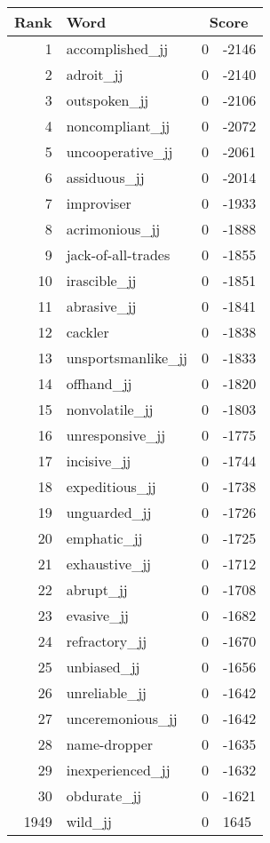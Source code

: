 \begin{longtable}[!htbp]{| rlr@{.}l |}
    \hline
    \textbf{Rank} & \textbf{Word} & \multicolumn{2}{c|}{\textbf{Score}} \\
    \hline
    \endhead
    1 & accomplished\_jj & 0 & -2146 \\
    2 & adroit\_jj & 0 & -2140 \\
    3 & outspoken\_jj & 0 & -2106 \\
    4 & noncompliant\_jj & 0 & -2072 \\
    5 & uncooperative\_jj & 0 & -2061 \\
    6 & assiduous\_jj & 0 & -2014 \\
    7 & improviser & 0 & -1933 \\
    8 & acrimonious\_jj & 0 & -1888 \\
    9 & jack-of-all-trades & 0 & -1855 \\
    10 & irascible\_jj & 0 & -1851 \\
    11 & abrasive\_jj & 0 & -1841 \\
    12 & cackler & 0 & -1838 \\
    13 & unsportsmanlike\_jj & 0 & -1833 \\
    14 & offhand\_jj & 0 & -1820 \\
    15 & nonvolatile\_jj & 0 & -1803 \\
    16 & unresponsive\_jj & 0 & -1775 \\
    17 & incisive\_jj & 0 & -1744 \\
    18 & expeditious\_jj & 0 & -1738 \\
    19 & unguarded\_jj & 0 & -1726 \\
    20 & emphatic\_jj & 0 & -1725 \\
    21 & exhaustive\_jj & 0 & -1712 \\
    22 & abrupt\_jj & 0 & -1708 \\
    23 & evasive\_jj & 0 & -1682 \\
    24 & refractory\_jj & 0 & -1670 \\
    25 & unbiased\_jj & 0 & -1656 \\
    26 & unreliable\_jj & 0 & -1642 \\
    27 & unceremonious\_jj & 0 & -1642 \\
    28 & name-dropper & 0 & -1635 \\
    29 & inexperienced\_jj & 0 & -1632 \\
    30 & obdurate\_jj & 0 & -1621 \\
    1949 & wild\_jj & 0 & 1645 \\

\end{longtable}
